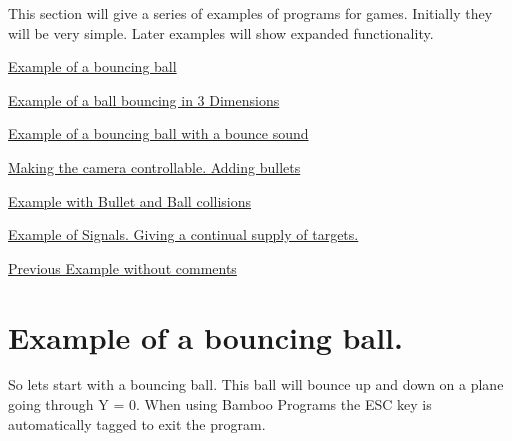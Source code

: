 This section will give a series of examples of programs for games. Initially they will be very simple. Later examples will show expanded functionality.
\begin{DoxyEnumerate}
\item \hyperlink{_code_program_examples_BouncingBallExample}{Example of a bouncing ball}
\item \hyperlink{_code_program_examples_ThreeDimensionBouncingBallExample}{Example of a ball bouncing in 3 Dimensions}
\item \hyperlink{_code_program_examples_SoundBouncingBallExample}{Example of a bouncing ball with a bounce sound}
\item \hyperlink{_code_program_examples_BulletsBouncingBallExample}{Making the camera controllable. Adding bullets}
\item \hyperlink{_code_program_examples_CollisionsBouncingBallExample}{Example with Bullet and Ball collisions}
\item \hyperlink{_code_program_examples_ReSpwaningBouncingBallExample}{Example of Signals. Giving a continual supply of targets.}
\item \hyperlink{_code_program_examples_CompleteNoCommentsBouncingBallExample}{Previous Example without comments}
\end{DoxyEnumerate}\hypertarget{_code_program_examples_BouncingBallExample}{}\section{Example of a bouncing ball.}\label{_code_program_examples_BouncingBallExample}
So lets start with a bouncing ball. This ball will bounce up and down on a plane going through Y = 0. When using Bamboo Programs the ESC key is automatically tagged to exit the program.


